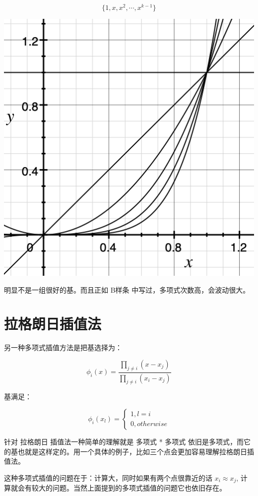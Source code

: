 \documentclass[
]{book}
\begin{document}
\[
\{1, x, x^2, \cdots, x^{k-1}\}
\]

\includegraphics{images/poly_basis.png}

明显不是一组很好的基。而且正如 B样条 中写过，多项式次数高，会波动很大。

\hypertarget{ux62c9ux683cux6717ux65e5ux63d2ux503cux6cd5}{%
\section{拉格朗日插值法}\label{ux62c9ux683cux6717ux65e5ux63d2ux503cux6cd5}}

另一种多项式插值方法是把基选择为：

\[
\phi_i(x) = \frac{\prod_{j \ne i} (x - x_j)}{\prod_{j \ne i} (x_i - x_j)}
\]

基满足：

\[
\phi_i(x_l) = \begin{cases}
      1, l = i\\
      0, otherwise
\end{cases}
\]

针对 拉格朗日 插值法一种简单的理解就是 多项式 * 多项式 依旧是多项式，而它的基也就是这样定的。用一个具体的例子，比如三个点会更加容易理解拉格朗日插值法。

这种多项式插值的问题在于：计算大，同时如果有两个点很靠近的话 \(x_i \approx x_j\), 计算就会有较大的问题。当然上面提到的多项式插值的问题它也依旧存在。
\end{document}
